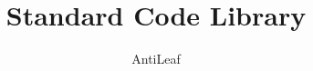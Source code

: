 \documentclass[a4paper, twoside]{article}
\title{Standard Code Library}
\author{AntiLeaf}
\date{}
\begin{document}
	\begin{titlepage}
		
		

	\end{titlepage}

	\pagestyle{plain}

	\setcounter{page}{1}

	\begin{multicols}{2}
		
		\begin{spacing}{1}
			\renewcommand{\contentsname}{\huge{目录}}
			\tableofcontents
		\end{spacing}

	\end{multicols}

	\newpage

	\pagestyle{fancy}

	\setcounter{page}{1}
\end{document}
